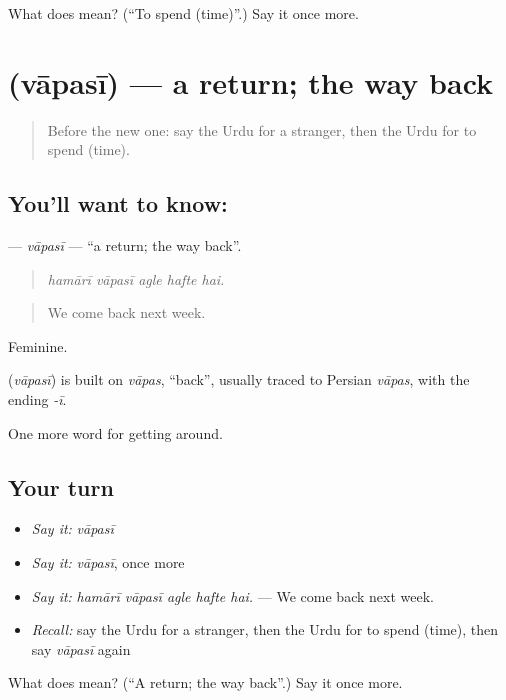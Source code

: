 \begin{tcolorbox}[breakable,colback=teal!4,colframe=teal!35!black,title={Before you move on}]
What does  mean? (\textquotedblleft{}To spend (time)\textquotedblright{}.) Say it once more.
\end{tcolorbox}
\section[\texorpdfstring{\ur{واپسی} (vāpasī)}{واپسی (vāpasī)}]{ (vāpasī) — a return; the way back}

\label{lesson:UR-C400-vapasi}



\begin{quote}
Before the new one: say the Urdu for a stranger, then the Urdu for to spend (time).
\end{quote}

\subsection*{You'll want to know: }
\textbf{} — \emph{vāpasī} — \textquotedblleft{}a return; the way back\textquotedblright{}.

\begin{quote}
    
\end{quote}

\begin{quote}
\emph{hamārī vāpasī agle hafte hai.}
\end{quote}

\begin{quote}
We come back next week.
\end{quote}

Feminine.

\begin{cousinweb}
\textbf{} (\emph{vāpasī}) is built on \emph{vāpas}, \textquotedblleft{}back\textquotedblright{}, usually traced to Persian \emph{vāpas}, with the ending \emph{-ī}.
\end{cousinweb}

\begin{grammarlens}[title={What you've built}]
One more word for getting around.
\end{grammarlens}

\subsection*{Your turn}
\begin{itemize}
\raggedright
  \item \emph{Say it:} \emph{vāpasī}
  \item \emph{Say it:} \emph{vāpasī}, once more
  \item \emph{Say it:} \emph{hamārī vāpasī agle hafte hai.} — We come back next week.
  \item \emph{Recall:} say the Urdu for a stranger, then the Urdu for to spend (time), then say \emph{vāpasī} again
\end{itemize}

\begin{tcolorbox}[breakable,colback=teal!4,colframe=teal!35!black,title={Before you move on}]
What does  mean? (\textquotedblleft{}A return; the way back\textquotedblright{}.) Say it once more.
\end{tcolorbox}
